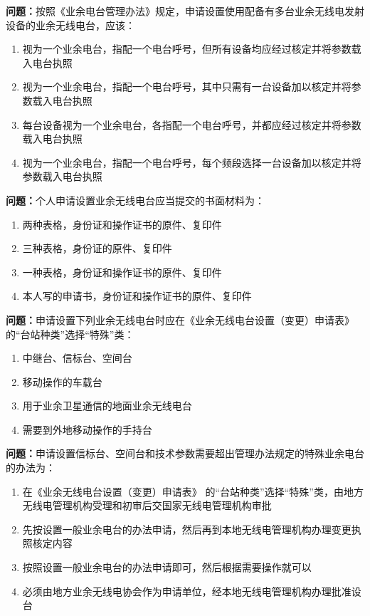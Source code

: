 \textbf{问题：}按照《业余电台管理办法》规定，申请设置使用配备有多台业余无线电发射设备的业余无线电台，应该：
\begin{enumerate}[label=\Alph*), leftmargin=3em]
	\item 视为一个业余电台，指配一个电台呼号，但所有设备均应经过核定并将参数载入电台执照
	\item 视为一个业余电台，指配一个电台呼号，其中只需有一台设备加以核定并将参数载入电台执照
	\item 每台设备视为一个业余电台，各指配一个电台呼号，并都应经过核定并将参数载入电台执照
	\item 视为一个业余电台，指配一个电台呼号，每个频段选择一台设备加以核定并将参数载入电台执照
\end{enumerate}

\textbf{问题：}个人申请设置业余无线电台应当提交的书面材料为：
\begin{enumerate}[label=\Alph*), leftmargin=3em]
	\item 两种表格，身份证和操作证书的原件、复印件
	\item 三种表格，身份证的原件、复印件
	\item 一种表格，身份证和操作证书的原件、复印件
	\item 本人写的申请书，身份证和操作证书的原件、复印件
\end{enumerate}

\textbf{问题：}申请设置下列业余无线电台时应在《业余无线电台设置（变更）申请表》 的“台站种类”选择“特殊”类：
\begin{enumerate}[label=\Alph*), leftmargin=3em]
	\item 中继台、信标台、空间台
	\item 移动操作的车载台
	\item 用于业余卫星通信的地面业余无线电台
	\item 需要到外地移动操作的手持台
\end{enumerate}

\textbf{问题：}申请设置信标台、空间台和技术参数需要超出管理办法规定的特殊业余电台的办法为：
\begin{enumerate}[label=\Alph*), leftmargin=3em]
	\item 在《业余无线电台设置（变更）申请表》 的“台站种类”选择“特殊”类，由地方无线电管理机构受理和初审后交国家无线电管理机构审批
	\item 先按设置一般业余电台的办法申请，然后再到本地无线电管理机构办理变更执照核定内容
	\item 按照设置一般业余电台的办法申请即可，然后根据需要操作就可以
	\item 必须由地方业余无线电协会作为申请单位，经本地无线电管理机构办理批准设台
\end{enumerate}


